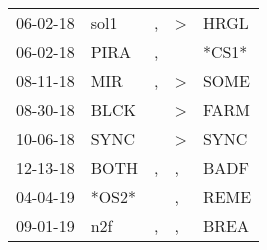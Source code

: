 \begin{supertabular}{p{0.07\textwidth}p{0.06\textwidth}p{0.02\textwidth}p{0.02\textwidth}p{0.06\textwidth}}
          06-02-18\textsuperscript{} &           sol1\textsuperscript{} &                , &     \textgreater &           HRGL\textsuperscript{} \\
          06-02-18\textsuperscript{} &           PIRA\textsuperscript{} &                , &                  &                            *CS1* \\
          08-11-18\textsuperscript{} &            MIR\textsuperscript{} &                , &     \textgreater &           SOME\textsuperscript{} \\
          08-30-18\textsuperscript{} &           BLCK\textsuperscript{} &                  &     \textgreater &           FARM\textsuperscript{} \\
          10-06-18\textsuperscript{} &           SYNC\textsuperscript{} &                  &     \textgreater &           SYNC\textsuperscript{} \\
          12-13-18\textsuperscript{} &           BOTH\textsuperscript{} &                , &                , &           BADF\textsuperscript{} \\
          04-04-19\textsuperscript{} &                            *OS2* &                  &                , &           REME\textsuperscript{} \\
          09-01-19\textsuperscript{} &            n2f\textsuperscript{} &                , &                , &           BREA\textsuperscript{} \\
\end{supertabular}
